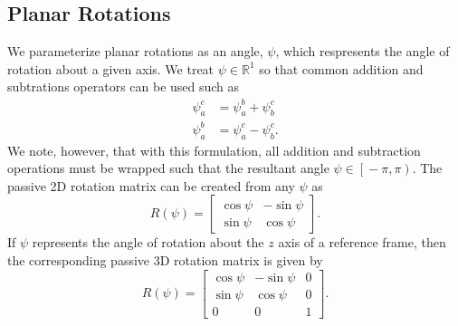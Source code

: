 
\subsection{Planar Rotations}
\label{sec:planar_rotations}

We parameterize planar rotations as an angle, $\psi$, which respresents
the angle of rotation about a given axis.
We treat $\psi \in \mathbb{R}^1$ so that common addition and subtrations
operators can be used such as
\begin{align}
  \psi_a^c &= \psi_a^b + \psi_b^c \\
  \psi_a^b &= \psi_a^c - \psi_b^c.
\end{align}
We note, however, that with this formulation, all addition and subtraction
operations must be wrapped such
that the resultant angle $\psi \in \left[ \right. -\pi, \pi \left. \right)$. The
passive 2D
rotation matrix can be created from any $\psi$ as
\begin{equation}
  R \left( \psi \right) = \begin{bmatrix} \cos \psi & -\sin \psi \\ \sin \psi &
  \cos \psi \end{bmatrix}.
\end{equation}
If $\psi$ represents the angle of rotation about the $z$ axis of a reference frame, then
the corresponding passive 3D rotation matrix is given by
\begin{equation}
  R \left( \psi \right) = \begin{bmatrix}
    \cos \psi & -\sin \psi & 0 \\
    \sin \psi & \cos \psi & 0 \\
    0 & 0 & 1
  \end{bmatrix}.
\end{equation}

